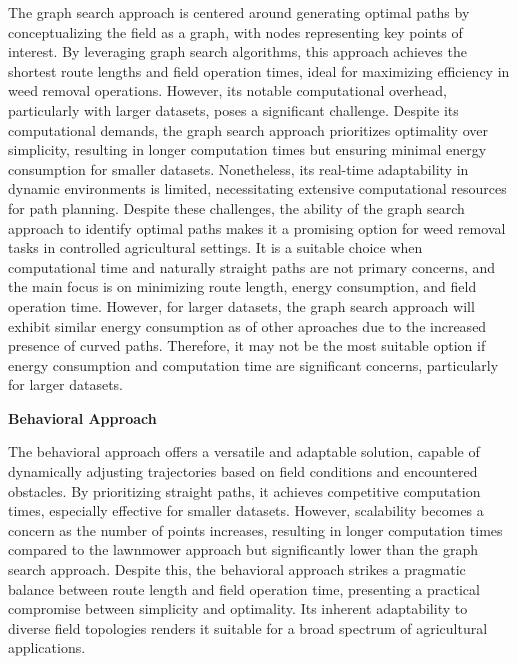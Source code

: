 The graph search approach is centered around generating optimal paths by conceptualizing the field as a graph, with nodes representing key points of interest. By leveraging graph search algorithms, this approach achieves the shortest route lengths and field operation times, ideal for maximizing efficiency in weed removal operations. However, its notable computational overhead, particularly with larger datasets, poses a significant challenge. Despite its computational demands, the graph search approach prioritizes optimality over simplicity, resulting in longer computation times but ensuring minimal energy consumption for smaller datasets. Nonetheless, its real-time adaptability in dynamic environments is limited, necessitating extensive computational resources for path planning. Despite these challenges, the ability of the graph search approach to identify optimal paths makes it a promising option for weed removal tasks in controlled agricultural settings. It is a suitable choice when computational time and naturally straight paths are not primary concerns, and the main focus is on minimizing route length, energy consumption, and field operation time. However, for larger datasets, the graph search approach will exhibit similar energy consumption as of other aproaches due to the increased presence of curved paths. Therefore, it may not be the most suitable option if energy consumption and computation time are significant concerns, particularly for larger datasets. 

\vspace{3mm} 

\textbf{Behavioral Approach}

The behavioral approach offers a versatile and adaptable solution, capable of dynamically adjusting trajectories based on field conditions and encountered obstacles. By prioritizing straight paths, it achieves competitive computation times, especially effective for smaller datasets. However, scalability becomes a concern as the number of points increases, resulting in longer computation times compared to the lawnmower approach but significantly lower than the graph search approach. Despite this, the behavioral approach strikes a pragmatic balance between route length and field operation time, presenting a practical compromise between simplicity and optimality. Its inherent adaptability to diverse field topologies renders it suitable for a broad spectrum of agricultural applications.

\vspace{3mm} 

